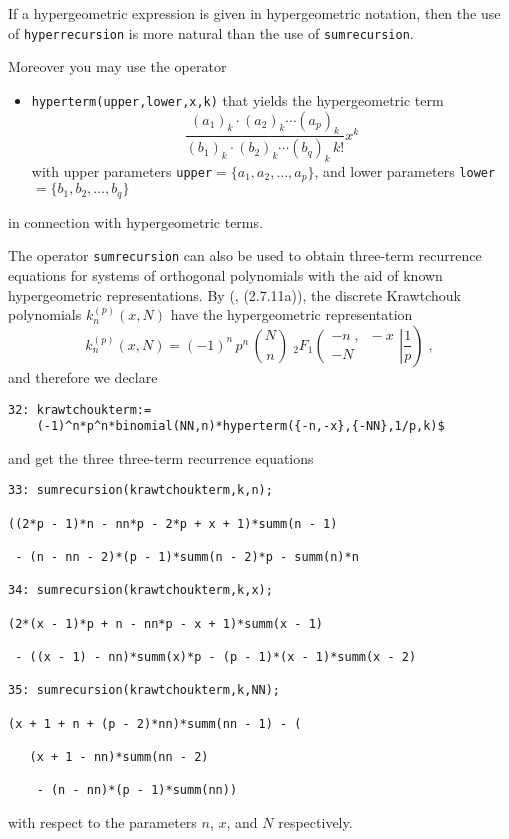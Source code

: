 If a hypergeometric expression is given in hypergeometric notation, then
the use of \texttt{hyperrecursion} is more natural than the use of
\texttt{sumrecursion}.

Moreover you may use the \REDUCE{} operator
\begin{itemize}
\item
\texttt{hyperterm(upper,lower,x,k)} that yields the hypergeometric term
\[
\frac
{(a_{1})_{k}\cdot(a_{2})_{k}\cdots(a_{p})_{k}}
{(b_{1})_{k}\cdot(b_{2})_{k}\cdots(b_{q})_{k}\,k!}x^{k}
\]
with upper parameters \texttt{upper}$=\{a_{1}, a_{2}, \ldots, a_{p}\}$,
and lower parameters \texttt{lower}$=\{b_{1}, b_{2}, \ldots, b_{q}\}$
\end{itemize}
in connection with hypergeometric terms.

The operator \texttt{sumrecursion} can also be used to
obtain three-term recurrence equations for systems of orthogonal polynomials
with the aid of known hypergeometric representations. By
(\cite{NikiforovUvarovSuslov:91}, (2.7.11a)), the discrete Krawtchouk polynomials $k_n^{(p)}(x,N)$
have the hypergeometric representation
\[
k_n^{(p)}(x,N)=
(-1)^n\,p^n\,\binom{N}{n}\;
_2 F_1\left.
\left(
\begin{array}{c}
-n\;,\;\;-x\\[1mm]
-N
\end{array}
\right| \frac{1}{p}\right)
\;,
\]
and therefore we declare

{\small
\begin{verbatim}
32: krawtchoukterm:=
    (-1)^n*p^n*binomial(NN,n)*hyperterm({-n,-x},{-NN},1/p,k)$
\end{verbatim}
}\noindent
and get the three three-term recurrence equations

{\small
\begin{verbatim}
33: sumrecursion(krawtchoukterm,k,n);

((2*p - 1)*n - nn*p - 2*p + x + 1)*summ(n - 1)

 - (n - nn - 2)*(p - 1)*summ(n - 2)*p - summ(n)*n

34: sumrecursion(krawtchoukterm,k,x);

(2*(x - 1)*p + n - nn*p - x + 1)*summ(x - 1)

 - ((x - 1) - nn)*summ(x)*p - (p - 1)*(x - 1)*summ(x - 2)

35: sumrecursion(krawtchoukterm,k,NN);

(x + 1 + n + (p - 2)*nn)*summ(nn - 1) - (

   (x + 1 - nn)*summ(nn - 2)

    - (n - nn)*(p - 1)*summ(nn))
\end{verbatim}
}\noindent
with respect to the parameters $n$, $x$, and $N$ respectively.

